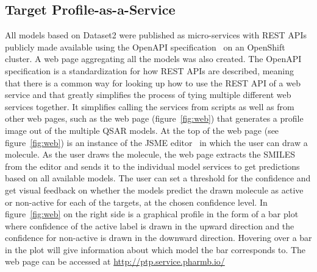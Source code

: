 \documentclass[utf8]{frontiersSCNS} %
\newcommand{\inlinetodo}[1]{{\color{magenta}\oldtodo[inline]{\color{white}\textsf{\small#1}}}}
\begin{document}
\subsection{Target Profile-as-a-Service}
All models based on Dataset2 were published as micro-services with REST APIs
publicly made available using the OpenAPI specification~\cite{OpenAPI} on an OpenShift~\cite{OpenShift} cluster.
A web page aggregating all the models was also created. The OpenAPI
specification is a standardization for how REST APIs are described, meaning
that there is a common way for looking up how to use the REST API of a web
service and that greatly simplifies the process of tying multiple different web
services together. It simplifies calling the services from scripts as well as
from other web pages, such as the web page (figure~\ref{fig:web}) that generates a profile image out of
the multiple QSAR models. At the top of the web page (see figure~\ref{fig:web})
is an instance of the JSME editor~\cite{Bienfait2013} in which the user can
draw a molecule. As the user draws the molecule, the web page extracts the
SMILES from the editor and sends it to the individual model services to get predictions
based on all available models. The user can set a threshold for the confidence
and get visual feedback on whether the models predict the drawn molecule as
active or non-active for each of the targets, at the chosen confidence level. In figure~\ref{fig:web} on
the right side is a graphical profile in the form of a bar plot where confidence of
the active label is drawn in the upward direction and the confidence for
non-active is drawn in the downward direction. Hovering over a bar in the plot will
give information about which model the bar corresponds to. The web page can
be accessed at \url{http://ptp.service.pharmb.io/}
\end{document}
